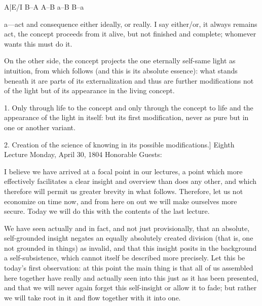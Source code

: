 A|E/I B–A A–B \R a–B B–a

a—act and consequence either ideally, or really.
I say either/or, it always remains act,
the concept proceeds from it alive,
but not finished and complete;
whomever wants this must do it.

On the other side, the concept projects
the one eternally self-same light as intuition,
from which follows (and this is its absolute essence):
what stands beneath it are parts of its externalization
and thus are further modifications not of the light
but of its appearance in the living concept.

1. Only through life to the concept
and only through the concept to life
and the appearance of the light in itself:
but its first modification, never as pure
but in one or another variant.

2. Creation of the science of knowing
in its possible modifications.]
Eighth Lecture
Monday, April 30, 1804
Honorable Guests:

I believe we have arrived at a focal point in our lectures,
a point which more effectively facilitates a
clear insight and overview than does any other,
and which therefore will permit us greater brevity in what follows.
Therefore, let us not economize on time now,
and from here on out we will make ourselves more secure.
Today we will do this with the contents of the last lecture.

We have seen actually and in fact,
and not just provisionally,
that an absolute, self-grounded insight negates
an equally absolutely created division
(that is, one not grounded in things)
as invalid, and that this insight posits
in the background a self-subsistence,
which cannot itself be described more precisely.
Let this be today’s first observation:
at this point the main thing is that
all of us assembled here together have
really and actually seen into this
just as it has been presented,
and that we will never again forget this
self-insight or allow it to fade;
but rather we will take root in it
and flow together with it into one.

